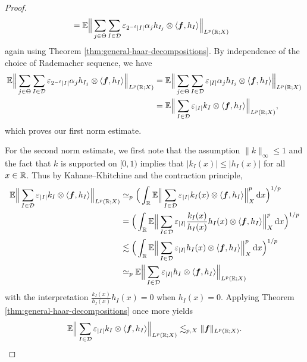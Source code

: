 \begin{proof}
\begin{equation*}
\begin{aligned}
      &= \mathbb{E} \Big\| \sum_{j \in \Theta} \sum_{I \in \mathcal{D}} \varepsilon_{2^{-\ell}|I|} \alpha_{j} h_{I_{j}} \otimes \langle \bm{f}, h_{I} \rangle \Big\|_{L^p(\mathbb{R};X)}
    \end{aligned}
   \end{equation*}
   again using Theorem \ref{thm:general-haar-decompositions}.
   By independence of the choice of Rademacher sequence, we have
   \begin{equation*}
     \begin{aligned}
       \mathbb{E} \Big\| \sum_{j \in \Theta} \sum_{I \in \mathcal{D}} \varepsilon_{2^{-\ell}|I|} \alpha_{j}  h_{I_{j}} \otimes \langle \bm{f}, h_{I} \rangle \Big\|_{L^p(\mathbb{R};X)}
       &= \mathbb{E} \Big\| \sum_{j \in \Theta} \sum_{I \in \mathcal{D}} \varepsilon_{|I|} \alpha_{j} h_{I_{j}} \otimes \langle \bm{f}, h_{I} \rangle \Big\|_{L^p(\mathbb{R};X)} \\
       &= \mathbb{E} \Big\| \sum_{I \in \mathcal{D}} \varepsilon_{|I|} k_{I} \otimes \langle \bm{f}, h_{I} \rangle \Big\|_{L^p(\mathbb{R};X)},
     \end{aligned}
   \end{equation*}
   which proves our first norm estimate.

   For the second norm estimate, we first note that the assumption $\|k\|_{\infty} \leq 1$ and the fact that $k$ is supported on $[0,1)$ implies that $|k_{I}(x)| \leq |h_{I}(x)|$ for all $x \in \mathbb{R}$.
   Thus by Kahane--Khitchine and the contraction principle,
   \begin{equation*}
     \begin{aligned}
       \mathbb{E} \Big\| \sum_{I \in \mathcal{D}} \varepsilon_{|I|} k_{I} \otimes \langle \bm{f}, h_{I} \rangle \Big\|_{L^p(\mathbb{R};X)}
       &\simeq_{p} \Big( \int_{\mathbb{R}} \mathbb{E} \Big\| \sum_{I \in \mathcal{D}} \varepsilon_{|I|} k_{I}(x) \otimes \langle \bm{f}, h_{I} \rangle \Big\|_{X}^{p} \, \mathrm{d} x \Big)^{1/p} \\
       &= \Big( \int_{\mathbb{R}} \mathbb{E} \Big\| \sum_{I \in \mathcal{D}} \varepsilon_{|I|} \frac{k_{I}(x)}{h_{I}(x)} h_{I}(x) \otimes \langle \bm{f}, h_{I} \rangle \Big\|_{X}^{p} \, \mathrm{d} x \Big)^{1/p} \\
       &\lesssim \Big( \int_{\mathbb{R}} \mathbb{E} \Big\| \sum_{I \in \mathcal{D}} \varepsilon_{|I|} h_{I}(x) \otimes \langle \bm{f}, h_{I} \rangle \Big\|_{X}^{p} \, \mathrm{d} x \Big)^{1/p} \\
       &\simeq_{p} \mathbb{E} \Big\| \sum_{I \in \mathcal{D}} \varepsilon_{|I|} h_{I} \otimes \langle \bm{f}, h_{I} \rangle \Big\|_{L^p(\mathbb{R};X)}
     \end{aligned}
   \end{equation*}
   with the interpretation $\frac{k_{I}(x)}{h_{I}(x)} h_{I}(x) = 0$ when $h_{I}(x) = 0$.
   Applying Theorem \ref{thm:general-haar-decompositions} once more yields
   \begin{equation*}
     \mathbb{E} \Big\| \sum_{I \in \mathcal{D}} \varepsilon_{|I|} k_{I} \otimes \langle \bm{f}, h_{I} \rangle \Big\|_{L^p(\mathbb{R};X)}
     \lesssim_{p,X} \|\bm{f}\|_{L^p(\mathbb{R};X)}.
   \end{equation*}


\end{proof}
